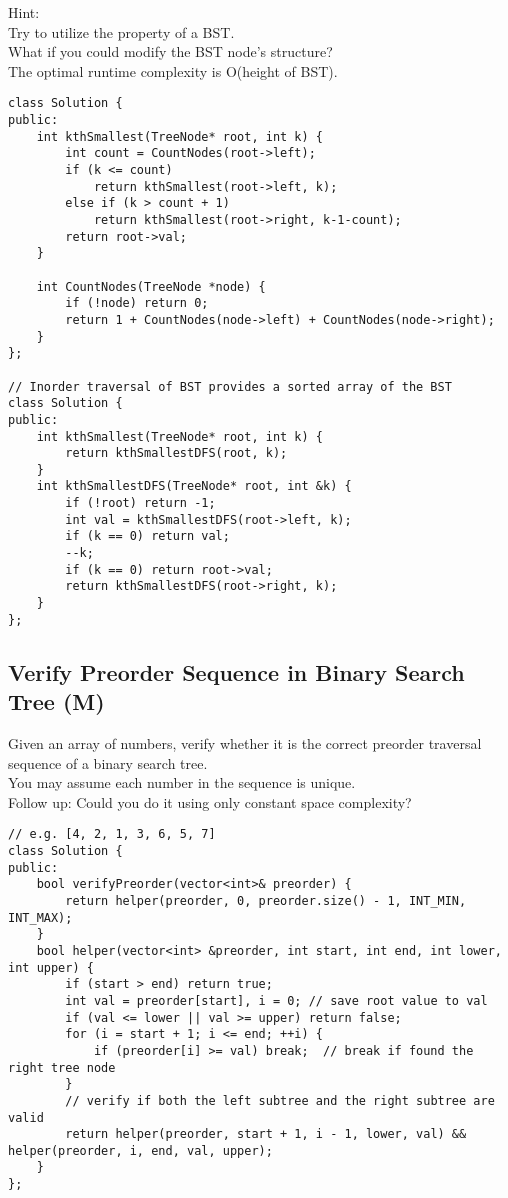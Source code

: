 Hint:\\
    Try to utilize the property of a BST.\\
    What if you could modify the BST node's structure?\\
    The optimal runtime complexity is O(height of BST).\\

\begin{lstlisting}
class Solution {
public:
    int kthSmallest(TreeNode* root, int k) {
        int count = CountNodes(root->left);
        if (k <= count)
            return kthSmallest(root->left, k);
        else if (k > count + 1)
            return kthSmallest(root->right, k-1-count);
        return root->val;
    }
    
    int CountNodes(TreeNode *node) {
        if (!node) return 0;
        return 1 + CountNodes(node->left) + CountNodes(node->right);
    }
};

// Inorder traversal of BST provides a sorted array of the BST
class Solution {
public:
    int kthSmallest(TreeNode* root, int k) {
        return kthSmallestDFS(root, k);
    }
    int kthSmallestDFS(TreeNode* root, int &k) {
        if (!root) return -1;
        int val = kthSmallestDFS(root->left, k);
        if (k == 0) return val;
        --k;
        if (k == 0) return root->val;
        return kthSmallestDFS(root->right, k);
    }
};
\end{lstlisting}


\subsection{Verify Preorder Sequence in Binary Search Tree (M)}
Given an array of numbers, verify whether it is the correct preorder traversal sequence of a binary search tree.\\

You may assume each number in the sequence is unique.\\

Follow up:
Could you do it using only constant space complexity?\\

\begin{lstlisting}
// e.g. [4, 2, 1, 3, 6, 5, 7]
class Solution {
public:
    bool verifyPreorder(vector<int>& preorder) {
        return helper(preorder, 0, preorder.size() - 1, INT_MIN, INT_MAX);
    }
    bool helper(vector<int> &preorder, int start, int end, int lower, int upper) {
        if (start > end) return true;
        int val = preorder[start], i = 0; // save root value to val
        if (val <= lower || val >= upper) return false;
        for (i = start + 1; i <= end; ++i) {
            if (preorder[i] >= val) break;  // break if found the right tree node
        }
        // verify if both the left subtree and the right subtree are valid
        return helper(preorder, start + 1, i - 1, lower, val) && helper(preorder, i, end, val, upper);
    }
};
\end{lstlisting}


